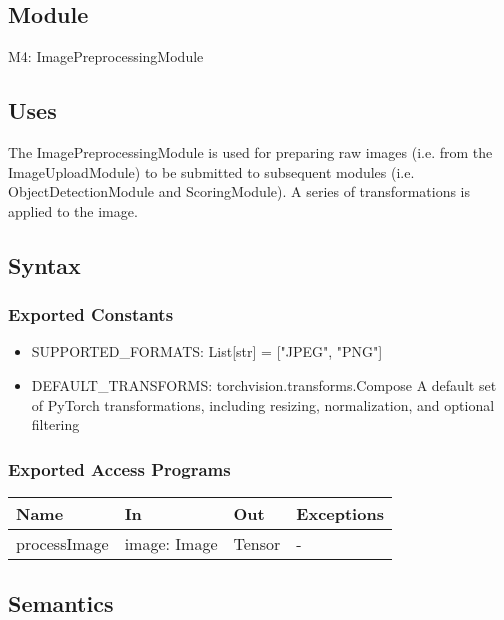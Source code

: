 \documentclass[12pt, titlepage]{article}
\begin{document}
\subsection{Module}

M4: ImagePreprocessingModule

\subsection{Uses}
The ImagePreprocessingModule is used for preparing raw images (i.e. from the ImageUploadModule) to be submitted to subsequent modules (i.e. ObjectDetectionModule and ScoringModule). A series of transformations is applied to the image.

\subsection{Syntax}

\subsubsection{Exported Constants}

\begin{itemize}
  \item SUPPORTED{\_}FORMATS: List[str] = ["JPEG", "PNG"]
  \item DEFAULT{\_}TRANSFORMS: torchvision.transforms.Compose\: A default set of PyTorch transformations, including resizing, normalization, and optional filtering
\end{itemize}

\subsubsection{Exported Access Programs}

\begin{center}
\begin{tabular}{p{4cm} p{4cm} p{4cm} p{3.5cm}}
\hline
\textbf{Name} & \textbf{In} & \textbf{Out} & \textbf{Exceptions} \\
\hline
processImage & image: Image & Tensor & - \\
\hline
\end{tabular}
\end{center}

\subsection{Semantics}
\end{document}
